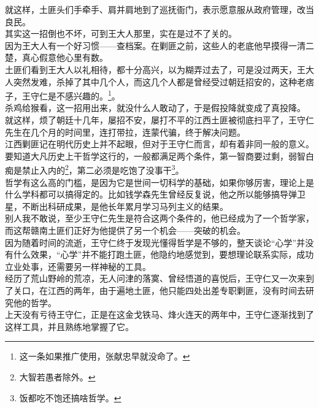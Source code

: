 \begin{multicols}{\theparacolNo}
就这样，土匪头们手牵手、肩并肩地到了巡抚衙门，表示愿意服从政府管理，改当良民。\\

其实这一招倒也不坏，可到王大人那里，实在是过不了关的。\\

因为王大人有一个好习惯——查档案。在剿匪之前，这些人的老底他早摸得一清二楚，真心假意他心里有数。\\

土匪们看到王大人以礼相待，都十分高兴，以为糊弄过去了，可是没过两天，王大人突然发难，杀掉了其中几个人，而这几个人都是曾经受过朝廷招安的，这种老痞子，王守仁是不感兴趣的。\footnote{这一条如果推广使用，张献忠早就没命了。}。\\

杀鸡给猴看，这一招用出来，就没什么人敢动了，于是假投降就变成了真投降。\\

就这样，烦了朝廷十几年，屡招不安，屡打不平的江西土匪被彻底扫平了，王守仁先生在几个月的时间里，连打带拉，连蒙代骗，终于解决问题。\\

江西剿匪记在明代历史上并不起眼，但对于王守仁而言，却有着非同一般的意义。\\

要知道大凡历史上干哲学这行的，一般都满足两个条件，第一智商要过剩，弱智白痴是禁止入内的\footnote{大智若愚者除外。}，第二必须是吃饱了没事干\footnote{饭都吃不饱还搞啥哲学。}。\\

哲学有这么高的门槛，是因为它是世间一切科学的基础，如果你够厉害，理论上是什么学科都可以搞得定的。比如钱学森先生曾经反复说，他之所以能够搞导弹卫星，不断出科研成果，是他长年累月学习马列主义的结果。\\

别人我不敢说，至少王守仁先生是符合这两个条件的，他已经成为了一个哲学家，而这帮赣南土匪们正好为他提供了另一个机会——突破的机会。\\

因为随着时间的流逝，王守仁终于发现光懂得哲学是不够的，整天谈论“心学”并没有什么效果，“心学”并不能打跑土匪，他隐约地感觉到，要想理论联系实际，成功立业处事，还需要另一样神秘的工具。\\

经历了荒山野岭的荒凉，无人问津的落寞、曾经悟道的喜悦后，王守仁又一次来到了关口，在江西的两年，由于遍地土匪，他只能四处出差专职剿匪，没有时间去研究他的哲学。\\

上天没有亏待王守仁，正是在这金戈铁马、烽火连天的两年中，王守仁逐渐找到了这样工具，并且熟练地掌握了它。\\


\end{multicols}
